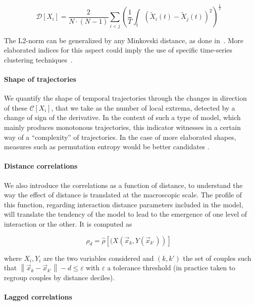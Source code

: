 \documentclass[graybox]{svmult}
\newcommand{\norm}[1]{\left\lVert #1 \right\rVert}
\begin{document}
\begin{equation}
\mathcal{D}\left[X_i\right] = \frac{2}{N\cdot(N-1)}\sum_{i<j} \left(\frac{1}{T}\int_{t} \left(\tilde{X}_i(t) - \tilde{X}_j(t)\right)^2 \right)^{\frac{1}{2}}
\end{equation}

The L2-norm can be generalized by any Minkovski distance, as done in~\cite{raimbault2016hybrid}. More elaborated indices for this aspect could imply the use of specific time-series clustering techniques~\cite{liao2005clustering}.


\paragraph{Shape of trajectories}

We quantify the shape of temporal trajectories through the changes in direction of these $\mathcal{C}\left[X_i\right]$, that we take as the number of local extrema, detected by a change of sign of the derivative. In the context of such a type of model, which mainly produces monotonous trajectories, this indicator witnesses in a certain way of a ``complexity'' of trajectories. In the case of more elaborated shapes, measures such as permutation entropy would be better candidates \cite{scarpino2017predictability}.
	
	
\paragraph{Distance correlations}

We also introduce the correlations as a function of distance, to understand the way the effect of distance is translated at the macroscopic scale. The profile of this function, regarding interaction distance parameters included in the model, will translate the tendency of the model to lead to the emergence of one level of interaction or the other. It is computed as

\begin{equation}
\rho_d = \hat{\rho}\left[(X(\vec{x}_k,Y(\vec{x}_{k'}))\right]
\end{equation}

where $X_i, Y_i$ are the two variables considered and $(k,k')$ the set of couples such that $\norm{\vec{x}_k-\vec{x}_{k'}} - d \leq \varepsilon$ with $\varepsilon$ a tolerance threshold (in practice taken to regroup couples by distance deciles).


\paragraph{Lagged correlations}
\end{document}

